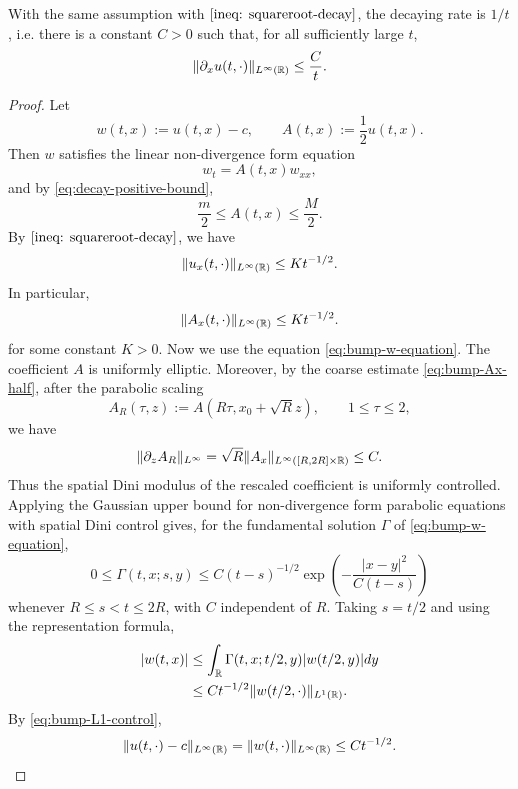 \begin{theorem}\label{thm:bump-ux-decay}
    With the same assumption with $\eqref{ineq: squareroot-decay}$, the decaying rate is $1/t$, i.e. there is a constant $C>0$ such that, for all sufficiently large $t$,
    \[
        \lVert \partial_x u(t,\cdot)\rVert_{L^{\infty}(\mathbb{R})}\leq \dfrac{C}{t}.
    \]
\end{theorem}
\begin{proof}
    Let
    \[
        w(t,x):=u(t,x)-c,
        \qquad
        A(t,x):=\dfrac12u(t,x).
    \]
    Then $w$ satisfies the linear non-divergence form equation
    \begin{equation}\label{eq:bump-w-equation}
        w_t=A(t,x)w_{xx},
    \end{equation}
    and by \eqref{eq:decay-positive-bound},
    \[
        \dfrac m2\leq A(t,x)\leq \dfrac M2.
    \]
    By $\eqref{ineq: squareroot-decay}$, we have \begin{equation}\label{eq:bump-ux-half}
        \lVert u_x(t,\cdot)\rVert_{L^{\infty}(\mathbb{R})}
        \leq Kt^{-1/2}.
    \end{equation}
    In particular,
    \begin{equation}\label{eq:bump-Ax-half}
        \lVert A_x(t,\cdot)\rVert_{L^{\infty}(\mathbb{R})}
        \leq Kt^{-1/2}.
    \end{equation}
    for some constant $K > 0$.
    Now we use the equation \eqref{eq:bump-w-equation}. The coefficient $A$ is uniformly elliptic. Moreover, by the coarse estimate \eqref{eq:bump-Ax-half}, after the parabolic scaling
    \[
        A_R(\tau,z):=A(R\tau,x_0+\sqrt R z),
        \qquad 1\leq \tau\leq2,
    \]
    we have
    \[
        \lVert \partial_z A_R\rVert_{L^{\infty}}
        =\sqrt R\lVert A_x\rVert_{L^{\infty}([R,2R]\times\mathbb{R})}
        \leq C.
    \]
    Thus the spatial Dini modulus of the rescaled coefficient is uniformly controlled. Applying the Gaussian upper bound for non-divergence form parabolic equations with spatial Dini control gives, for the fundamental solution $\Gamma$ of \eqref{eq:bump-w-equation},
    \[
        0\leq \Gamma(t,x;s,y)
        \leq C(t-s)^{-1/2}
        \exp\left(-\dfrac{|x-y|^2}{C(t-s)}\right)
    \]
    whenever $R\leq s<t\leq 2R$, with $C$ independent of $R$. Taking $s=t/2$ and using the representation formula,
    \[
    \begin{aligned}
        |w(t,x)|
        &\leq \int_{\mathbb{R}}\Gamma(t,x;t/2,y)|w(t/2,y)|dy \\
        &\leq Ct^{-1/2}\lVert w(t/2,\cdot)\rVert_{L^1(\mathbb{R})} .
    \end{aligned}
    \]
    By \eqref{eq:bump-L1-control},
    \begin{equation}\label{eq:bump-w-half}
        \lVert u(t,\cdot)-c\rVert_{L^{\infty}(\mathbb{R})}
        =\lVert w(t,\cdot)\rVert_{L^{\infty}(\mathbb{R})}
        \leq Ct^{-1/2}.
    \end{equation}


\end{proof}
